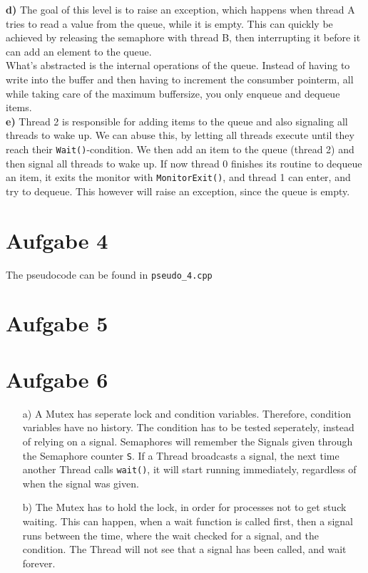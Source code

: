 \documentclass{article}
\begin{document}
\textbf{d)} The goal of this level is to raise an exception, which happens
when thread A tries to read a value from the queue, while it is empty.
This can quickly be achieved by releasing the semaphore with thread B,
then interrupting it before it can add an element to the queue.\\
What's abstracted is the internal operations of the queue.
Instead of having to write into the buffer and then having to increment
the consumber pointerm, all while taking care of the maximum
buffersize, you only enqueue and dequeue items.\\

\textbf{e)} Thread 2 is responsible for adding items to the queue and
also signaling all threads to wake up. We can abuse this, by letting all
threads execute until they reach their \texttt{Wait()}-condition. We then
add an item to the queue (thread 2) and then signal all threads to wake up.
If now thread 0 finishes its routine to dequeue an item, it exits the
monitor with \texttt{MonitorExit()}, and thread 1 can enter, and try
to dequeue. This however will raise an exception, since the queue is empty.

\section*{Aufgabe 4}
The pseudocode can be found in \texttt{pseudo\_4.cpp} \\
\section*{Aufgabe 5}
\section*{Aufgabe 6}
\begin{itemize}
    \item[a)]
	A Mutex has seperate lock and condition variables. Therefore, condition
	variables have no history. The condition has to be tested seperately,
	instead of relying on a signal.
	Semaphores will remember the Signals given through the Semaphore counter
	\verb=S=. If a Thread broadcasts a signal, the next time another Thread
	calls \verb=wait()=, it will start running immediately, regardless
	of when the signal was given.
    \item[b)]
	The Mutex has to hold the lock, in order for processes not to get stuck
	waiting. This can happen, when a wait function is called first, then a
	signal runs between the time, where the wait checked for a signal, and
	the condition. The Thread will not see that a signal has been called,
	and wait forever.
\end{itemize}
\end{document}
